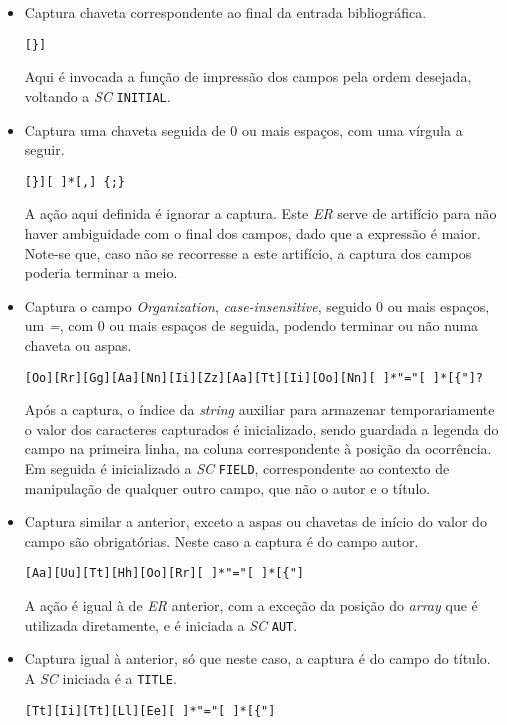 \begin{itemize}
\item Captura chaveta correspondente ao final da entrada bibliográfica.

\begin{verbatim}
[}] 
\end{verbatim}
Aqui é invocada a função de impressão dos campos pela ordem desejada, voltando
a \emph{SC} \texttt{INITIAL}.
\item Captura uma chaveta seguida de 0 ou mais espaços, com uma vírgula
	a seguir.

\begin{verbatim}
[}][ ]*[,] {;} 
\end{verbatim}

A ação aqui definida é ignorar a captura. Este \emph{ER} serve de artifício
para não haver ambiguidade com o final dos campos, dado que a expressão
é maior. Note-se que, caso não se recorresse a este artifício, a captura dos
campos poderia terminar a meio.

\item Captura o campo \emph{Organization}, \emph{case-insensitive}, seguido 0 ou
	mais espaços, um \emph{=}, com 0 ou mais espaços de seguida, podendo terminar
	ou não numa chaveta ou aspas.
\begin{verbatim}
[Oo][Rr][Gg][Aa][Nn][Ii][Zz][Aa][Tt][Ii][Oo][Nn][ ]*"="[ ]*[{"]? 
\end{verbatim}

Após a captura, o índice da \emph{string} auxiliar para armazenar
temporariamente o valor dos caracteres capturados é inicializado, sendo guardada
a legenda do campo na primeira linha, na coluna correspondente à posição da
ocorrência. Em seguida é inicializado a \emph{SC} \texttt{FIELD}, correspondente
ao contexto de manipulação de qualquer outro campo, que não o autor e o título.
                            
\item Captura similar a anterior, exceto a aspas ou chavetas de início do valor
	do campo são obrigatórias. Neste caso a captura é do campo autor.
\begin{verbatim}
[Aa][Uu][Tt][Hh][Oo][Rr][ ]*"="[ ]*[{"] 
\end{verbatim}

A ação é igual à de \emph{ER} anterior, com a exceção da posição do
\emph{array} que é utilizada diretamente, e é iniciada a \emph{SC} \texttt{AUT}.



\item Captura igual à anterior, só que neste caso, a captura é do campo do
	título. A \emph{SC} iniciada é a \texttt{TITLE}.
\begin{verbatim}
[Tt][Ii][Tt][Ll][Ee][ ]*"="[ ]*[{"] 
\end{verbatim}


\end{itemize}
